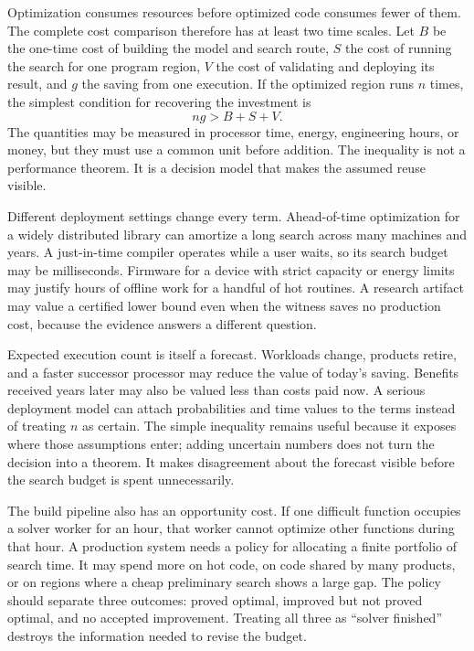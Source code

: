 Optimization consumes resources before optimized code consumes fewer of them.
The complete cost comparison therefore has at least two time scales. Let
\(B\) be the one-time cost of building the model and search route, \(S\) the
cost of running the search for one program region, \(V\) the cost of validating
and deploying its result, and \(g\) the saving from one execution. If the
optimized region runs \(n\) times, the simplest condition for recovering the
investment is
\[
  n g > B+S+V.
\]
The quantities may be measured in processor time, energy, engineering hours,
or money, but they must use a common unit before addition. The inequality is
not a performance theorem. It is a decision model that makes the assumed
reuse visible.

Different deployment settings change every term. Ahead-of-time optimization
for a widely distributed library can amortize a long search across many
machines and years. A just-in-time compiler operates while a user waits, so
its search budget may be milliseconds. Firmware for a device with strict
capacity or energy limits may justify hours of offline work for a handful of
hot routines. A research artifact may value a certified lower bound even when
the witness saves no production cost, because the evidence answers a different
question.

Expected execution count is itself a forecast. Workloads change, products
retire, and a faster successor processor may reduce the value of today's
saving. Benefits received years later may also be valued less than costs paid
now. A serious deployment model can attach probabilities and time values to
the terms instead of treating \(n\) as certain. The simple inequality remains
useful because it exposes where those assumptions enter; adding uncertain
numbers does not turn the decision into a theorem.
It makes disagreement about the forecast visible before the search budget is
spent unnecessarily.

The build pipeline also has an opportunity cost. If one difficult function
occupies a solver worker for an hour, that worker cannot optimize other
functions during that hour. A production system needs a policy for allocating
a finite portfolio of search time. It may spend more on hot code, on code
shared by many products, or on regions where a cheap preliminary search shows
a large gap. The policy should separate three outcomes: proved optimal,
improved but not proved optimal, and no accepted improvement. Treating all
three as ``solver finished'' destroys the information needed to revise the
budget.

